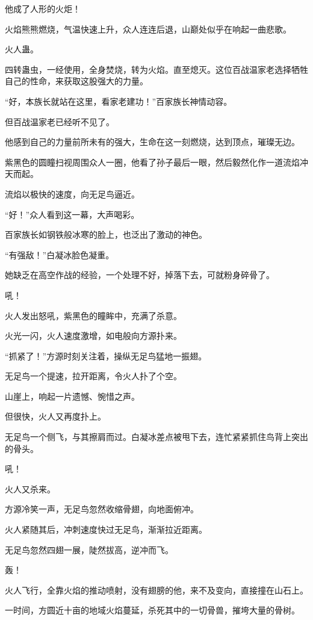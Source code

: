 \begin{this_body}
他成了人形的火炬！

火焰熊熊燃烧，气温快速上升，众人连连后退，山巅处似乎在响起一曲悲歌。

火人蛊。

四转蛊虫，一经使用，全身焚烧，转为火焰。直至熄灭。这位百战温家老选择牺牲自己的性命，来获取这股强大的力量。

“好，本族长就站在这里，看家老建功！”百家族长神情动容。

但百战温家老已经听不见了。

他感到自己的力量前所未有的强大，生命在这一刻燃烧，达到顶点，璀璨无边。

紫黑色的圆瞳扫视周围众人一圈，他看了孙子最后一眼，然后毅然化作一道流焰冲天而起。

流焰以极快的速度，向无足鸟逼近。

“好！”众人看到这一幕，大声喝彩。

百家族长如钢铁般冰寒的脸上，也泛出了激动的神色。

“有强敌！”白凝冰脸色凝重。

她缺乏在高空作战的经验，一个处理不好，掉落下去，可就粉身碎骨了。

吼！

火人发出怒吼，紫黑色的瞳眸中，充满了杀意。

火光一闪，火人速度激增，如电般向方源扑来。

“抓紧了！”方源时刻关注着，操纵无足鸟猛地一振翅。

无足鸟一个提速，拉开距离，令火人扑了个空。

山崖上，响起一片遗憾、惋惜之声。

但很快，火人又再度扑上。

无足鸟一个侧飞，与其擦肩而过。白凝冰差点被甩下去，连忙紧紧抓住鸟背上突出的骨头。

吼！

火人又杀来。

方源冷笑一声，无足鸟忽然收缩骨翅，向地面俯冲。

火人紧随其后，冲刺速度快过无足鸟，渐渐拉近距离。

无足鸟忽然四翅一展，陡然拔高，逆冲而飞。

轰！

火人飞行，全靠火焰的推动喷射，没有翅膀的他，来不及变向，直接撞在山石上。

一时间，方圆近十亩的地域火焰蔓延，杀死其中的一切骨兽，摧垮大量的骨树。


\end{this_body}
